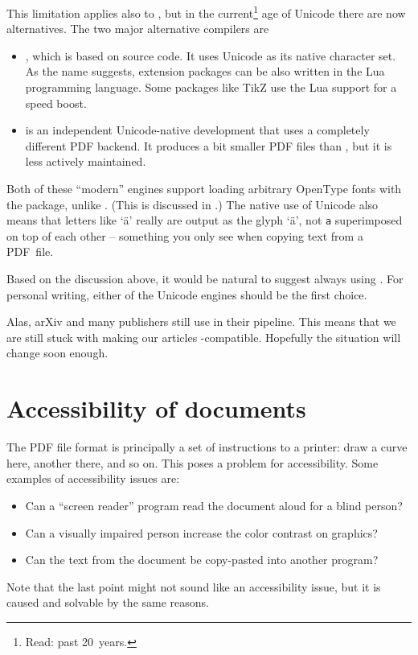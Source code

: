 This limitation applies also to ,
but in the current\footnote{Read: past 20~years.} age of Unicode there are now alternatives.
The two major alternative compilers are
\begin{itemize}
\item {}, which is based on  source code.
    It uses Unicode as its native character set.
    As the name suggests, extension packages can be also written in the Lua programming language.
    Some packages like TikZ use the Lua support for a speed boost.
\item {} is an independent Unicode-native development
    that uses a completely different PDF backend.
    It produces a bit smaller PDF files than ,
    but it is less actively maintained.
\end{itemize}

Both of these ``modern'' engines support loading arbitrary OpenType fonts
with the  package, unlike .
(This is discussed in .)
The native use of Unicode also means that letters like `ä'
really are output as the glyph `ä',
not \texttt{\textasciidieresis a} superimposed on top of each other
-- something you only see when copying text from a PDF~file.

\begin{practices}
Based on the discussion above,
it would be natural to suggest always using .
For personal writing, either of the Unicode engines should be the first choice.

Alas, arXiv and many publishers still use  in their pipeline.
This means that we are still stuck with making our articles -compatible.
Hopefully the situation will change soon enough.
\end{practices}



%
%
%
\section{Accessibility of documents}

The PDF file format is principally a set of instructions to a printer:
draw a curve here, another there, and so on.
This poses a problem for accessibility.
Some examples of accessibility issues are:
%
\begin{itemize}
\item Can a ``screen reader'' program read the document aloud for a blind person?
\item Can a visually impaired person increase the color contrast on graphics?
\item Can the text from the document be copy-pasted into another program?
\end{itemize}
%
Note that the last point might not sound like an accessibility issue,
but it is caused and solvable by the same reasons.

